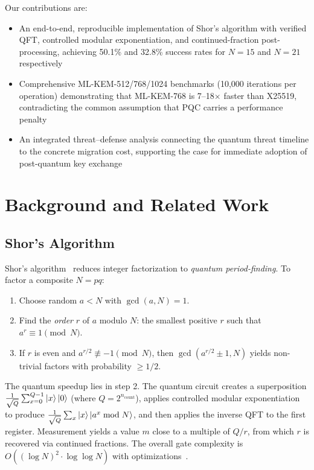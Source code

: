 \documentclass[conference]{IEEEtran}
\begin{document}
Our contributions are:
\begin{itemize}[leftmargin=*]
    \item An end-to-end, reproducible implementation of Shor's algorithm with verified QFT, controlled modular exponentiation, and continued-fraction post-processing, achieving 50.1\% and 32.8\% success rates for $N=15$ and $N=21$ respectively
    \item Comprehensive ML-KEM-512/768/1024 benchmarks (10,000 iterations per operation) demonstrating that ML-KEM-768 is 7--18$\times$ faster than X25519, contradicting the common assumption that PQC carries a performance penalty
    \item An integrated threat--defense analysis connecting the quantum threat timeline to the concrete migration cost, supporting the case for immediate adoption of post-quantum key exchange
\end{itemize}

\section{Background and Related Work}
\label{sec:background}

\subsection{Shor's Algorithm}

Shor's algorithm~\cite{shor1994} reduces integer factorization to \emph{quantum period-finding}. To factor a composite $N = pq$:
\begin{enumerate}[leftmargin=*]
    \item Choose random $a < N$ with $\gcd(a, N) = 1$.
    \item Find the \emph{order} $r$ of $a$ modulo $N$: the smallest positive $r$ such that $a^r \equiv 1 \pmod{N}$.
    \item If $r$ is even and $a^{r/2} \not\equiv -1 \pmod{N}$, then $\gcd(a^{r/2} \pm 1, N)$ yields non-trivial factors with probability $\geq 1/2$.
\end{enumerate}

The quantum speedup lies in step 2. The quantum circuit creates a superposition $\frac{1}{\sqrt{Q}} \sum_{x=0}^{Q-1} \ket{x}\ket{0}$ (where $Q = 2^{n_\text{count}}$), applies controlled modular exponentiation to produce $\frac{1}{\sqrt{Q}} \sum_{x} \ket{x}\ket{a^x \bmod N}$, and then applies the inverse QFT to the first register. Measurement yields a value $m$ close to a multiple of $Q/r$, from which $r$ is recovered via continued fractions. The overall gate complexity is $O((\log N)^2 \cdot \log \log N)$ with optimizations~\cite{gidney2021}.
\end{document}
